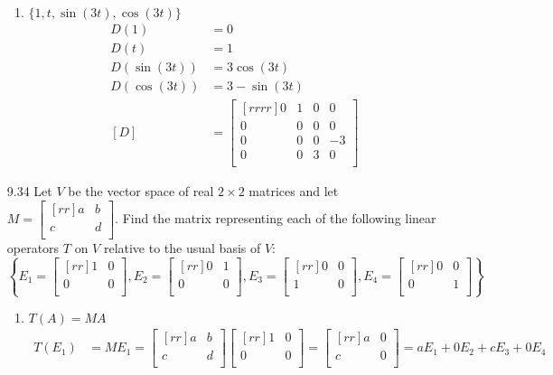 \documentclass[12pt]{article}
\theoremstyle{definition}
\theoremstyle{plain}
\begin{document}
\begin{enumerate}
\begin{enumerate}
	\item $\{1,t,\sin(3t),\cos(3t)\}$
		\begin{align*}
		D(1)&=0\\
		D(t)&=1\\
		D(\sin(3t))&=3\cos(3t)\\
		D(\cos(3t))&=3-\sin(3t)\\
		[D] &= \begin{bmatrix}[rrrr]0&1&0&0\\0&0&0&0\\0&0&0&-3\\0&0&3&0\\\end{bmatrix}
		\end{align*}
	\end{enumerate}
\item[9.34]Let $V$ be the vector space of real $2\times2$ matrices and let $M=\begin{bmatrix}[rr]a&b\\c&d\\\end{bmatrix}$. Find the matrix representing each of the following linear operators $T$ on $V$ relative to the usual basis of $V$:
\[ \left\{ E_1=\begin{bmatrix}[rr]1&0\\0&0\\\end{bmatrix}, E_2=\begin{bmatrix}[rr]0&1\\0&0\\\end{bmatrix}, E_3=\begin{bmatrix}[rr]0&0\\1&0\\\end{bmatrix},E_4=\begin{bmatrix}[rr]0&0\\0&1\\\end{bmatrix} \right\} \]
	\begin{enumerate}
	\item $T(A)=MA$
		\begin{align*}
		T(E_1)&=ME_1 = \begin{bmatrix}[rr]a&b\\c&d\\\end{bmatrix}\begin{bmatrix}[rr]1&0\\0&0\\\end{bmatrix} = \begin{bmatrix}[rr]a&0\\c&0\\\end{bmatrix} = aE_1+0E_2+cE_3+0E_4\\

\end{align*}
\end{enumerate}
\end{enumerate}
\end{document}
